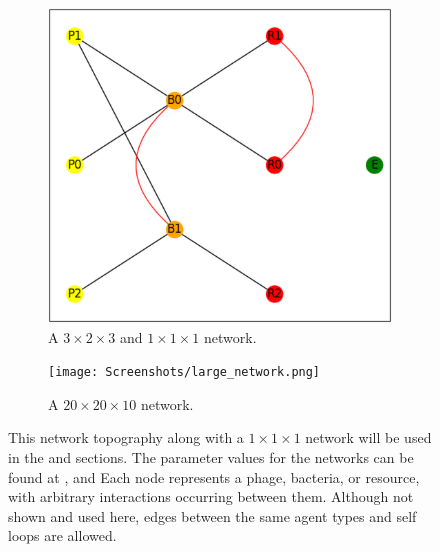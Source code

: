 \begin{figure}
\begin{subfigure}{0.49\linewidth}
        \includegraphics[width=\linewidth]{Screenshots/example_network.png}
        \caption{
            A $3\times2\times3$ and $1\times 1 \times 1$ network. 
        }
        \label{fig:ss:example_network}
    \end{subfigure} 
    \begin{subfigure}{0.49\linewidth}
        \centering
        \captionsetup{width=1\linewidth}
        \texttt{[image: Screenshots/large\_network.png]}
        \caption{
            A $20\times20\times10$ network. 
        }
        \label{fig:ss:example_network}
    \end{subfigure} 

    \caption{
        This network topography along with a $1 \times 1 \times 1$ network will be used in the  and  sections. 
            The parameter values for the networks can be found at ,  and 
        Each node represents a phage, bacteria, or resource, with arbitrary interactions occurring between them. 
        Although not shown and used here, edges between the same agent types and self loops are allowed. 
    }
 \end{figure}

